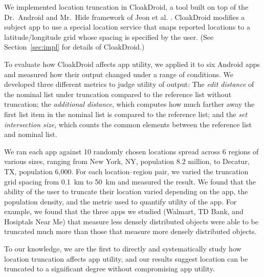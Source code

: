 \documentclass[10pt, conference, compsocconf]{IEEEtran}
\newcommand{\fuzzer}{CloakDroid\xspace}
\newcommand{\numpointspercity}{10\xspace}
\newcommand{\numcities}{6\xspace}
\begin{document}
We implemented location truncation in \fuzzer{}, a tool built on top
of the Dr.~Android and Mr.~Hide framework of Jeon et al.
\cite{jsjeon:spsm12}. \fuzzer{} modifies a subject app to use a special
location service that snaps reported locations to a latitude/longitude
grid whose spacing is specified by the user.  (See
Section~\ref{sec:impl} for details of \fuzzer{}.)

To evaluate how \fuzzer{} affects app utility, we applied it to six
Android apps and measured how their output changed under a range of
conditions. 
We developed three different metrics to judge utility of output:
The \emph{edit distance} of the nominal list under truncation compared to 
the reference list without truncation; the \emph{additional distance}, 
which computes how much farther away the first list item in the
nominal list is compared to the reference list;
and the \emph{set intersection size}, which counts the 
common elements between the reference list and nominal list.


We ran each app against \numpointspercity randomly chosen locations
spread
across \numcities regions of various sizes, ranging from New York, NY,
population 8.2 million, to Decatur, TX, population 6,000. For each
location--region pair, we varied the truncation grid spacing from 0.1~km
to 50~km and measured the result. We found that the ability of the user
to truncate their location varied depending on the app, the population
density, and the metric used to quantify utility of the app.
For example, we found that the three apps we studied
(Walmart, TD Bank, and Hosiptals Near Me)
that measure less densely distributed objects were able to be truncated much more 
than those that measure more densely distributed objects.

To our knowledge, we are the first to directly and systematically
study how location truncation affects app utility, and our results
suggest location can be truncated to a significant degree without
compromising app utility.
\end{document}

